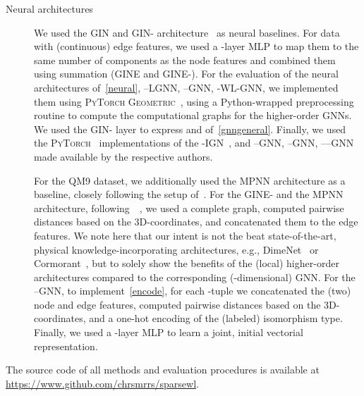 \documentclass{article}
\theoremstyle{definition}
\newcommand{\CC}[1][]{}
\newcommand{\deltakwln}{--\textsf{GNN}\xspace}
\newcommand{\localkwln}{--\textsf{LGNN}\xspace}
\newcommand{\kwln}{-\textsf{WL-GNN}\xspace}
\newcommand{\gnn}{\textsf{GNN}\xspace}
\newcommand{\mpnn}{\textsf{MPNN}\xspace}
\newcommand{\gin}{\textsf{GIN}\xspace}
\newcommand{\gine}{\textsf{GINE}\xspace}
\newcommand{\gineps}{\textsf{GIN-}\xspace}
\newcommand{\gineeps}{\textsf{GINE-}\xspace}
\begin{document}
\begin{description}
	\item[Neural architectures] We used the \gin and \gineps architecture~\cite{Xu+2018b} as neural baselines. For data with (continuous) edge features, we used a -layer MLP to map them to the same number of components as the node features and combined them using summation (\gine and \gineeps). For the evaluation of the neural architectures of~\cref{neural}, \localkwln, \deltakwln, \kwln, we implemented them using \textsc{PyTorch Geometric}~\cite{Fey+2019}, using a  Python-wrapped \CC[11] preprocessing routine to compute the computational graphs for the higher-order GNNs. We used the \gineps layer to express  and  of~\cref{gnngeneral}. Finally, we used the \textsc{PyTorch}~\cite{Pas+2019} implementations of the -\textsf{IGN}~\cite{Mar+2019}, and --\gnn, --\gnn, ---\gnn~\cite{Mor+2019} made available by the respective authors. 
	
	For the \textsc{QM9} dataset, we additionally used the \mpnn architecture as a baseline, closely following the setup of~\cite{Gil+2017}. For the \gineeps and the \mpnn architecture, following~\citeauthor{Gil+2017}~\cite{Gil+2017}, we used a complete graph, computed pairwise  distances based on the 3D-coordinates, and concatenated them to the edge features. We note here that our intent is not the beat state-of-the-art, physical knowledge-incorporating architectures, e.g., \textsf{DimeNet}~\cite{Kli+2020} or \textsf{Cormorant}~\cite{And+2019}, but to solely show the benefits of the (local) higher-order architectures compared to the corresponding (-dimensional) GNN. For the --\textsf{GNN}, to implement~\cref{encode}, for each -tuple we concatenated the (two) node and edge features, computed pairwise  distances based on the 3D-coordinates, and a one-hot encoding of the (labeled) isomorphism type. Finally, we used a -layer MLP to learn a joint, initial vectorial representation.
\end{description}
The source code of all methods and evaluation procedures is available at \url{https://www.github.com/chrsmrrs/sparsewl}.
\end{document}
